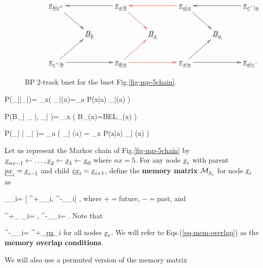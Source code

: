 \begin{figure}[h!]
$$\xymatrix{
&\ul{\pi}_{\rvb|\rveps^+}\ar[dr]
&&\ul{\pi}_{\rvx|\rvb}\ar[ll]\ar@[red][dr]
&&\ul{\pi}_{\rva|\rvx}\ar@[red][ll]\ar[dr]
&&\ul{\pi}_{\rveps^-|\rva}\ar[ll]
\\
&&\rvB_\rvb
&&\rvB_\rvx
&&\rvB_\rva
\\
&\ul{\pi}_{\rveps^+|\rvb}\ar[rr]\ar[ur]
&&\ul{\pi}_{\rvb|\rvx}\ar@[red][rr]\ar@[red][ur]
&&\ul{\pi}_{\rvx|\rva}\ar[rr]\ar[ur]
&&\ul{\pi}_{\rva|\rveps^-}
}$$
\caption{BP 2-track bnet for the bnet
Fig.\ref{fig-mp-5chain}.}
\label{fig-BEL-4pi}
\end{figure}


\beq\color{blue}
P(\pi_{\rvx|\rvb}|\pi_{\rva|\rvx})=
\prod_{x}\indi\left(
\pi_{\rvx|\rvb}(x)=\sum_a P(x|a)
\pi_{\rva|\rvx}(a)
\right)
\label{eq-pr-pi-bar-pi}
\eeq

\beq\color{blue}
P(B_\rvx|
\pi_{ \rvx|\rvb},
\pi_{\rvb| \rvx})=
\prod_x
\indi\left(
B_\rvx(x)=BEL_\rvx(x)
\right)
\eeq

\beq\color{blue}
P(\pi_{\rvx| \rva}|
\pi_{\rvb| \rvx})=
\prod_{a}
\indi\left(
\pi_{\rvx| \rva}(a)
=
\sum_x P(x|a)
\pi_{\rvb| \rvx}(x)
\right)
\label{eq-pr-lam-bar-lam}
\eeq

Let us represent the Markov
chain of Fig.\ref{fig-mp-5chain}
by
$\rvx_{nx-1}
\larrow \ldots, \rvx_2\larrow \rvx_1\larrow \rvx_0$
where $nx=5$.
For any node
$\rvx_i$
with
parent $\ul{px}_i=\rvx_{i-1}$
and child $\ul{cx}_i=\rvx_{i+1}$,
define
the {\bf memory matrix}
$\calm_{\rvx_i}$
for node $\rvx_i$
as

\beq
\calm_{\rvx_i}=
[
\calm^+_{\rvx_i},
\calm^-_{\rvx_i}]
\;,
\eeq
where $+=$future, $-=$past, and

\beq
\calm^+_{ \rvx_i}=
\;,
\;\;\;
\calm^-_{\rvx_i}=
\;.
\eeq
Note that

\beq
\calm^-_{\rvx_i}=
\calm^+_{\ul{px}_i}
\label{eq-mem-overlap}
\eeq
for all nodes $\rvx_i$.
We will refer to
Eqs.(\ref{eq-mem-overlap}) as
the {\bf memory overlap
conditions}.

We will also use a permuted version of the
memory matrix

